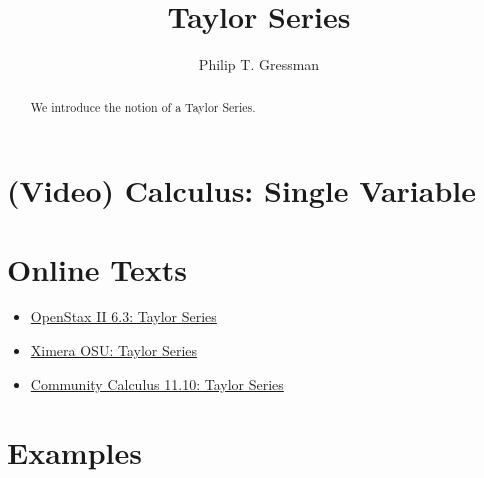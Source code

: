 \documentclass{ximera}
\title{Taylor Series}
\author{Philip T. Gressman}
\begin{document}
\begin{abstract}
We introduce the notion of a Taylor Series.
\end{abstract}
\maketitle

\section*{(Video) Calculus: Single Variable}


\section*{Online Texts}
\begin{itemize}
\item \href{https://openstax.org/books/calculus-volume-2/pages/6-3-taylor-and-maclaurin-series}{OpenStax II 6.3: Taylor Series}
\item \href{https://ximera.osu.edu/mooculus/calculus2/introductionToTaylorSeries/titlePage}{Ximera OSU: Taylor Series}
\item \href{https://www.whitman.edu/mathematics/calculus_online/section11.10.html}{Community Calculus 11.10: Taylor Series}
\end{itemize}

\section*{Examples}

\begin{example}

\end{example}

\begin{example}

\end{example}
\end{document}
